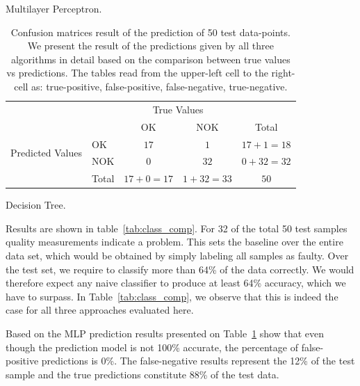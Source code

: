 \documentclass[5p,times,procedia]{elsarticle}
\begin{document}
\begin{table}
\begin{subtable}[h]{0.3\textwidth}
              \caption{Multilayer Perceptron.}
              \label{tab:MPL_conf_matrix}
       \end{subtable}
       \begin{subtable}[h]{0.3\textwidth}
              \centering
              \begin{adjustbox}{width=1.6\textwidth}
              \begin{tabular}{l|l|c|c|c}
                     \multicolumn{2}{c}{}&\multicolumn{2}{c}{True Values}&\\
                     \cline{3-4}
                     \multicolumn{2}{c|}{}& OK & NOK &\multicolumn{1}{c}{Total}\\
                     \cline{2-4}
                     \multirow{2}{*}{Predicted Values}& OK & $17$ & $1$ & $17+1 = 18$\\
                     \cline{2-4}
                     & NOK & $0$ & $32$ & $0+32 = 32$\\
                     \cline{2-4}
                     \multicolumn{1}{c}{} & \multicolumn{1}{c}{Total} & \multicolumn{1}{c}{$17+0 = 17$} & \multicolumn{    1}{c}{$1+32 = 33$} & \multicolumn{1}{c}{$50$}\\
              \end{tabular}
              \end{adjustbox}
              \caption{Decision Tree.}
              \label{tab:Tree_conf_matrix}
       \end{subtable}
       \caption{Confusion matrices result of the prediction of 50 test data-points. We present the result of the predictions given by all three algorithms in detail based on the comparison between true values vs predictions. The tables read from the upper-left cell to the right-cell as: true-positive, false-positive, false-negative, true-negative.}
       \label{tab:Confusion_matrix}
\end{table}


Results are shown in table~\ref{tab:class_comp}. For 32 of the total 50 test samples
quality measurements indicate a problem. This sets the 
baseline over the entire data set, which would be obtained by simply labeling all samples
as faulty. Over the test set, we require to classify more than 64\% of the data correctly.
We would therefore expect any naive classifier to produce at least 64\% accuracy, which we have to surpass. In Table~\ref{tab:class_comp}, we observe that this is indeed the case for all three approaches evaluated here.

Based on the MLP prediction results presented on Table~\ref{tab:Confusion_matrix} show that even though the prediction model is not 100\% accurate, the percentage of false-positive predictions is 0\%. The false-negative results represent the 12\% of the test sample and the true predictions constitute 88\% of the test data.
\end{document}
